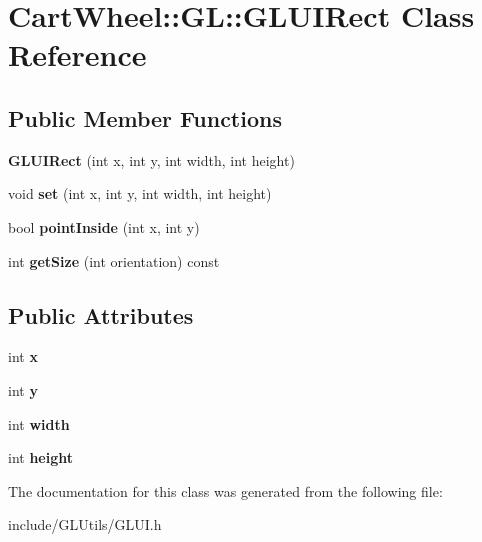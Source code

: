 \hypertarget{classCartWheel_1_1GL_1_1GLUIRect}{
\section{CartWheel::GL::GLUIRect Class Reference}
\label{classCartWheel_1_1GL_1_1GLUIRect}
}
\subsection*{Public Member Functions}
\begin{DoxyCompactItemize}
\item 
\hypertarget{classCartWheel_1_1GL_1_1GLUIRect_acc4921ad041b642c50644b56b4f266fc}{
{\bfseries GLUIRect} (int x, int y, int width, int height)}
\label{classCartWheel_1_1GL_1_1GLUIRect_acc4921ad041b642c50644b56b4f266fc}

\item 
\hypertarget{classCartWheel_1_1GL_1_1GLUIRect_af293bd0e9f2ea3b206b43c4d5bbe4dba}{
void {\bfseries set} (int x, int y, int width, int height)}
\label{classCartWheel_1_1GL_1_1GLUIRect_af293bd0e9f2ea3b206b43c4d5bbe4dba}

\item 
\hypertarget{classCartWheel_1_1GL_1_1GLUIRect_ad18f25354af17dca1bfbfba17da2bc92}{
bool {\bfseries pointInside} (int x, int y)}
\label{classCartWheel_1_1GL_1_1GLUIRect_ad18f25354af17dca1bfbfba17da2bc92}

\item 
\hypertarget{classCartWheel_1_1GL_1_1GLUIRect_ab90041d5df85c82e5578addeaff2df0d}{
int {\bfseries getSize} (int orientation) const }
\label{classCartWheel_1_1GL_1_1GLUIRect_ab90041d5df85c82e5578addeaff2df0d}

\end{DoxyCompactItemize}
\subsection*{Public Attributes}
\begin{DoxyCompactItemize}
\item 
\hypertarget{classCartWheel_1_1GL_1_1GLUIRect_a9ad23d21ee28c59bde9a61aedeba5012}{
int {\bfseries x}}
\label{classCartWheel_1_1GL_1_1GLUIRect_a9ad23d21ee28c59bde9a61aedeba5012}

\item 
\hypertarget{classCartWheel_1_1GL_1_1GLUIRect_a01faf9639f15ea79d1637d6fe3ba4a6a}{
int {\bfseries y}}
\label{classCartWheel_1_1GL_1_1GLUIRect_a01faf9639f15ea79d1637d6fe3ba4a6a}

\item 
\hypertarget{classCartWheel_1_1GL_1_1GLUIRect_a5b3c522a6e0f0d1a48d6fb8fb00530b9}{
int {\bfseries width}}
\label{classCartWheel_1_1GL_1_1GLUIRect_a5b3c522a6e0f0d1a48d6fb8fb00530b9}

\item 
\hypertarget{classCartWheel_1_1GL_1_1GLUIRect_a1fff0ba2142acdc8c4fdd236ae433358}{
int {\bfseries height}}
\label{classCartWheel_1_1GL_1_1GLUIRect_a1fff0ba2142acdc8c4fdd236ae433358}

\end{DoxyCompactItemize}


The documentation for this class was generated from the following file:\begin{DoxyCompactItemize}
\item 
include/GLUtils/GLUI.h\end{DoxyCompactItemize}
